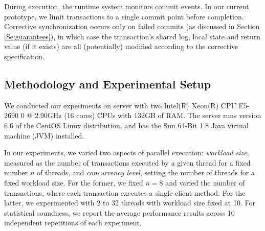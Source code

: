 During execution, the runtime system monitors commit events. In our current prototype, we limit transactions to a single commit point before completion. Corrective synchronization occurs only on failed commits (as discussed in Section \ref{Se:guarantees}), in which case the transaction's shared log, local state and return value (if it exists) are all (potentially) modified according to the corrective specification. 


\subsection{Methodology and Experimental Setup}

We conducted our experiments on server with two Intel(R) Xeon(R) CPU E5-2690 0 @ 2.90GHz (16 cores) CPUs with 132GB of RAM. The server runs version
6.6 of the CentOS Linux distribution, and has the Sun 64-Bit 1.8 Java virtual machine (JVM) installed.

In our experiments, we varied two aspects of parallel execution: \emph{workload size}, measured as the number of transactions executed by a given thread for a fixed number $n$ of threads, and \emph{concurrency level}, setting the number of threads for a fixed workload size. For the former, we fixed $n=8$ and varied the number of transactions, where each transaction executes a single client method. For the latter, we experimented with 2 to 32 threads with workload size fixed at 10.
For statistical soundness, we report the average performance results across 10 independent repetitions of each experiment.

